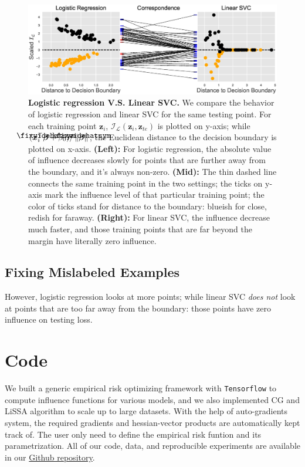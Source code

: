 \documentclass{article}
\newcommand\lowerwidehatsym{%
  \text{\smash{\raisebox{-1.3ex}{%
    $\fixwidehatsym$}}}}
\newcommand\fixwidehat[1]{%
  \mathchoice
    {\accentset{\displaystyle\lowerwidehatsym}{#1}}
    {\accentset{\textstyle\lowerwidehatsym}{#1}}
    {\accentset{\scriptstyle\lowerwidehatsym}{#1}}
    {\accentset{\scriptscriptstyle\lowerwidehatsym}{#1}}
}
\begin{document}
\setcounter{figure}{4}
\begin{figure}[h]
\vskip 0.0in
\begin{center}
\centerline{\includegraphics[width=\columnwidth]{fig-app1}}
\vskip -0.1in
\caption{\textbf{Logistic regression V.S. Linear SVC.} We compare the behavior of logistic regression and linear SVC for the same testing point. For each training point $\bm{z}_{i}$, $\mathcal{I}_{\mathcal{L}}(\bm{z}_{i}, \bm{z}_{te})$ is plotted on y-axis; while $ (\bm{x}_{i}^{\top}\fixwidehat{\bm{\beta}}+\beta_0) / \left\lVert \fixwidehat{\bm{\beta}}\right\rVert$, the Euclidean distance to the decision boundary is plotted on x-axis. \textbf{(Left):} For logistic regression, the absolute value of influence decreases slowly for points that are further away from the boundary, and it's always non-zero. \textbf{(Mid):} The thin dashed line connects the same training point in the two settings; the ticks on y-axis mark the influence level of that particular training point; the color of ticks stand for distance to the boundary: blueish for close, redish for faraway. \textbf{(Right):} For linear SVC, the influence decrease much faster, and those training points that are far beyond the margin have literally zero influence.} 
\label{model_behav_fig}
\end{center}
\vskip 0in
\end{figure}

\subsection{Fixing Mislabeled Examples}
However, logistic regression looks at more points; while linear SVC \emph{does not} look at points that are too far away from the boundary: those points have zero influence on testing loss.

\section{Code}
We built a generic empirical risk optimizing framework with \texttt{Tensorflow} to compute influence functions for various models, and we also implemented CG and LiSSA algorithm to scale up to large datasets. With the help of auto-gradients system, the required gradients and hessian-vector products are automatically kept track of. The user only need to define the empirical risk funtion and its parametrization. All of our code, data, and reproducible experiments are available in our \href{https://github.com/zedyang/46927-Project}{Github repository}.





\end{document}
